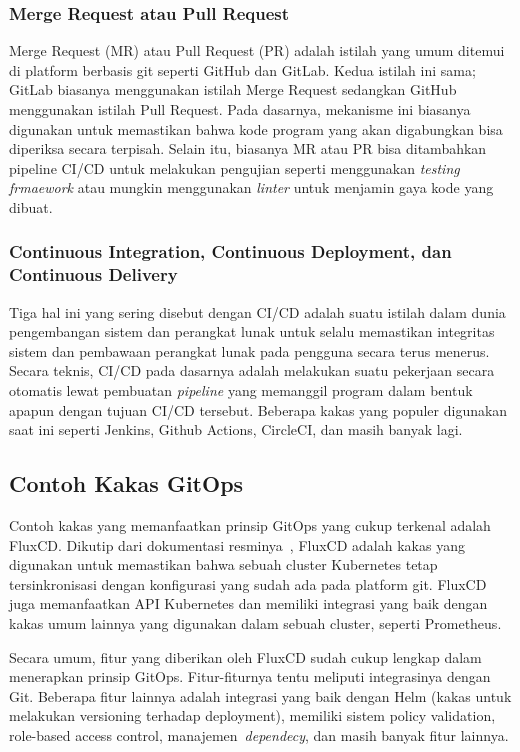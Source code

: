 \subsubsection{Merge Request atau Pull Request}

Merge Request (MR) atau Pull Request (PR) adalah istilah yang umum ditemui di platform berbasis git seperti GitHub dan GitLab. Kedua istilah ini sama; GitLab biasanya menggunakan istilah Merge Request sedangkan GitHub menggunakan istilah Pull Request. Pada dasarnya, mekanisme ini biasanya digunakan untuk memastikan bahwa kode program yang akan digabungkan bisa diperiksa secara terpisah. Selain itu, biasanya MR atau PR bisa ditambahkan pipeline CI/CD untuk melakukan pengujian seperti menggunakan \textit{testing frmaework} atau mungkin menggunakan \textit{linter} untuk menjamin gaya kode yang dibuat. 

\subsubsection{Continuous Integration, Continuous Deployment, dan Continuous Delivery}

Tiga hal ini yang sering disebut dengan CI/CD adalah suatu istilah dalam dunia pengembangan sistem dan perangkat lunak untuk selalu memastikan integritas sistem dan pembawaan perangkat lunak pada pengguna secara terus menerus. Secara teknis, CI/CD pada dasarnya adalah melakukan suatu pekerjaan secara otomatis lewat pembuatan \textit{pipeline} yang memanggil program dalam bentuk apapun dengan tujuan CI/CD tersebut. Beberapa kakas yang populer digunakan saat ini seperti Jenkins, Github Actions, CircleCI, dan masih banyak lagi.

\subsection{Contoh Kakas GitOps}

Contoh kakas yang memanfaatkan prinsip GitOps yang cukup terkenal adalah FluxCD. Dikutip dari dokumentasi resminya~\cite{fluxcd}, FluxCD adalah kakas yang digunakan untuk memastikan bahwa sebuah cluster Kubernetes tetap tersinkronisasi dengan konfigurasi yang sudah ada pada platform git. FluxCD juga memanfaatkan API Kubernetes dan memiliki integrasi yang baik dengan kakas umum lainnya yang digunakan dalam sebuah cluster, seperti Prometheus.

Secara umum, fitur yang diberikan oleh FluxCD sudah cukup lengkap dalam menerapkan prinsip GitOps. Fitur-fiturnya tentu meliputi integrasinya dengan Git. Beberapa fitur lainnya adalah integrasi yang baik dengan Helm (kakas untuk melakukan versioning terhadap deployment), memiliki sistem policy validation, role-based access control, manajemen~\textit{dependecy}, dan masih banyak fitur lainnya.